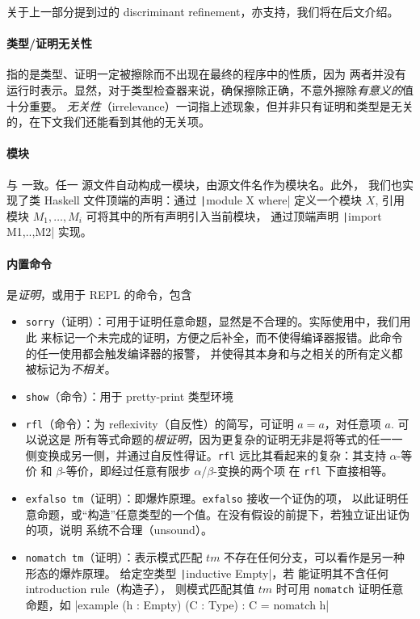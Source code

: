 \documentclass[a4paper, 11pt]{article}
\theoremstyle{remark}\newtheorem*{remark}{Remark}
\theoremstyle{definition}\newtheorem*{definition}{Definition}
\begin{document}
关于上一部分提到过的 discriminant refinement，\Tigrisd 亦支持，我们将在后文介绍。

\paragraph{类型/证明无关性} 指的是类型、证明一定被擦除而不出现在最终的程序中的性质，因为
两者并没有运行时表示。显然，对于类型检查器来说，确保擦除正确，不意外擦除\emph{有意义的}值十分重要。
\emph{无关性}（irrelevance）一词指上述现象，但并非只有证明和类型是无关的，在下文我们还能看到其他的无关项。

\paragraph{模块} 与 \Tigris 一致。任一 \Tigrisd 源文件自动构成一模块，由源文件名作为模块名。此外，
我们也实现了类 Haskell 文件顶端的声明：通过 \texttt|module X where| 定义一个模块 $X$,
引用模块 $M_1,\dots,M_i$ 可将其中的所有声明引入当前模块，
通过顶端声明 \texttt|import M1,..,M2| 实现。

\paragraph{内置命令} 是\emph{证明}，或用于 REPL 的命令，包含
\begin{itemize}\itemsep0em
\item \texttt{sorry}（证明）：可用于证明任意命题，显然是不合理的。实际使用中，我们用此
来标记一个未完成的证明，方便之后补全，而不使得编译器报错。此命令的任一使用都会触发编译器的报警，
并使得其本身和与之相关的所有定义都被标记为\emph{不相关}。
\item \texttt{show}（命令）：用于 pretty-print 类型环境
\item \texttt{rfl}（命令）：为 reflexivity（自反性）的简写，可证明 $a = a$，对任意项 $a$. 可以说这是
所有等式命题的\emph{根证明}，因为更复杂的证明无非是将等式的任一一侧变换成另一侧，并通过自反性得证。\texttt{rfl}
远比其看起来的复杂：其支持 $\alpha$-等价 和 $\beta$-等价，即经过任意有限步 $\alpha$/$\beta$-变换的两个项
在 \texttt{rfl} 下直接相等。
\item \texttt{exfalso tm}（证明）：即爆炸原理。\texttt{exfalso} 接收一个证伪的项，
以此证明任意命题，或“构造”任意类型的一个值。在没有假设的前提下，若独立证出证伪的项，说明
系统不合理（unsound）。
\item \texttt{nomatch tm}（证明）：表示模式匹配 $tm$ 不存在任何分支，可以看作是另一种形态的爆炸原理。
给定空类型 \texttt|inductive Empty|，若 \Tigrisd 能证明其不含任何 introduction rule（构造子），
则模式匹配其值 $tm$ 时可用 \texttt{nomatch} 证明任意命题，如
|example (h : Empty) (C : Type) : C = nomatch h|
\end{itemize}
\end{document}
